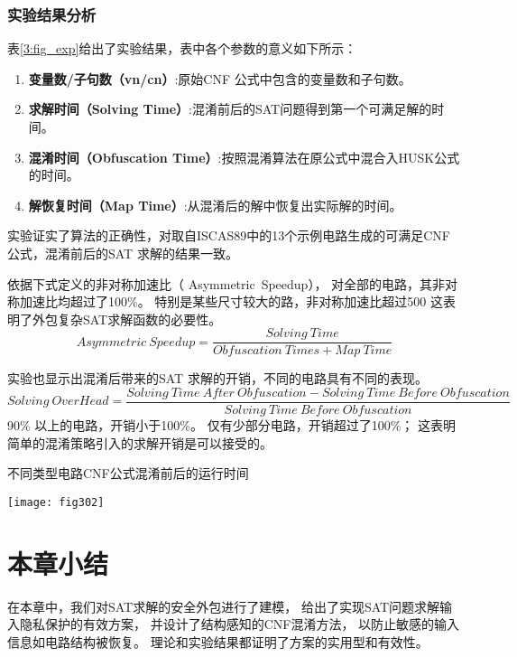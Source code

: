 \subsubsection{实验结果分析}
表\ref{3:fig_exp}给出了实验结果，表中各个参数的意义如下所示：
\begin{enumerate}
\item \textbf{变量数/子句数（vn/cn）}:原始CNF 公式中包含的变量数和子句数。
\item \textbf{求解时间（Solving Time）}:混淆前后的SAT问题得到第一个可满足解的时间。
\item \textbf{混淆时间（Obfuscation Time）}:按照混淆算法在原公式中混合入HUSK公式的时间。
\item \textbf{解恢复时间（Map Time）}:从混淆后的解中恢复出实际解的时间。
\end{enumerate}

实验证实了算法的正确性，对取自ISCAS89中的13个示例电路生成的可满足CNF公式，混淆前后的SAT 求解的结果一致。

依据下式定义的非对称加速比（ Asymmetric~Speedup），
对全部的电路，其非对称加速比均超过了100\%。
特别是某些尺寸较大的路，非对称加速比超过500%
这表明了外包复杂SAT求解函数的必要性。
\begin{equation}
Asymmetric~Speedup= \frac{Solving~Time}{Obfuscation~Times + Map~Time}
\end{equation}

实验也显示出混淆后带来的SAT 求解的开销，不同的电路具有不同的表现。
\begin{equation}
Solving~OverHead=\frac{Solving~Time~After~Obfuscation-Solving~Time~Before~Obfuscation}{Solving~Time~Before~Obfuscation}
\end{equation}
90\% 以上的电路，开销小于100\%。
仅有少部分电路，开销超过了100\%；
 这表明简单的混淆策略引入的求解开销是可以接受的。

\begin{table*}
\caption{不同类型电路CNF公式混淆前后的运行时间}
\centering
\texttt{[image: fig302]}
\label{3:fig_exp}
\end{table*}%
%
\section{本章小结}
在本章中，我们对SAT求解的安全外包进行了建模，
给出了实现SAT问题求解输入隐私保护的有效方案，
并设计了结构感知的CNF混淆方法，
以防止敏感的输入信息如电路结构被恢复。
理论和实验结果都证明了方案的实用型和有效性。
